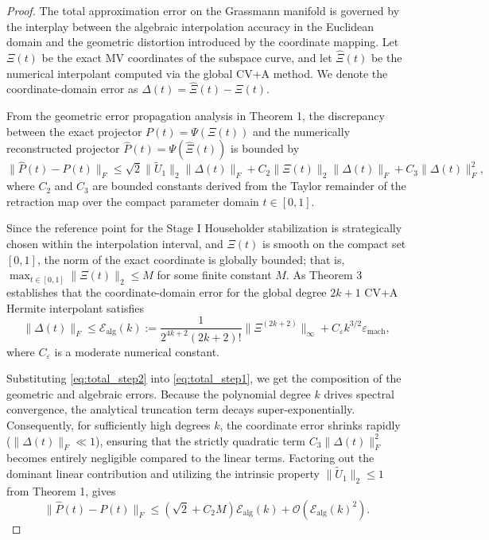 \documentclass[11pt]{article}
\begin{document}
\begin{proof}
The total approximation error on the Grassmann manifold is governed by the interplay between the algebraic interpolation accuracy in the Euclidean domain and the geometric distortion introduced by the coordinate mapping. Let $\Xi(t)$ be the exact MV coordinates of the subspace curve, and let $\hat{\Xi}(t)$ be the numerical interpolant computed via the global CV+A method. We denote the coordinate-domain error as $\Delta(t) = \hat{\Xi}(t) - \Xi(t)$.

From the geometric error propagation analysis in Theorem 1, the discrepancy between the exact projector $P(t) = \Psi(\Xi(t))$ and the numerically reconstructed projector $\hat{P}(t) = \Psi(\hat{\Xi}(t))$ is bounded by
\begin{equation} \label{eq:total_step1}
\|\hat{P}(t) - P(t)\|_F \leq \sqrt{2} \|\widetilde{U}_1\|_2 \|\Delta(t)\|_F + C_2 \|\Xi(t)\|_2 \|\Delta(t)\|_F + C_3 \|\Delta(t)\|_F^2,
\end{equation}
where $C_2$ and $C_3$ are bounded constants derived from the Taylor remainder of the retraction map over the compact parameter domain $t \in [0,1]$.

Since the reference point for the Stage I Householder stabilization is strategically chosen within the interpolation interval, and $\Xi(t)$ is smooth on the compact set $[0,1]$, the norm of the exact coordinate is globally bounded; that is, $\max_{t \in [0,1]} \|\Xi(t)\|_2 \leq M$ for some finite constant $M$.
As Theorem 3 establishes that the coordinate-domain error for the global degree $2k+1$ CV+A Hermite interpolant satisfies
\begin{equation} \label{eq:total_step2}
\|\Delta(t)\|_F \leq \mathcal{E}_{\mathrm{alg}}(k) := \frac{1}{2^{4k+2}(2k+2)!} \|\Xi^{(2k+2)}\|_\infty + C_\varepsilon k^{3/2} \varepsilon_{\mathrm{mach}},
\end{equation}
where $C_\varepsilon$ is a moderate numerical constant.

Substituting \eqref{eq:total_step2} into \eqref{eq:total_step1}, we get the composition of the geometric and algebraic errors. Because the polynomial degree $k$ drives spectral convergence, the analytical truncation term decays super-exponentially. Consequently, for sufficiently high degrees $k$, the coordinate error shrinks rapidly ($\|\Delta(t)\|_F \ll 1$), ensuring that the strictly quadratic term $C_3 \|\Delta(t)\|_F^2$ becomes entirely negligible compared to the linear terms.
Factoring out the dominant linear contribution and utilizing the intrinsic property $\|\widetilde{U}_1\|_2 \le 1$ from Theorem 1, gives
\begin{equation} \label{eq:linear_contribution}
\|\hat{P}(t) - P(t)\|_F \leq \left( \sqrt{2} + C_2 M \right) \mathcal{E}_{\mathrm{alg}}(k) + \mathcal{O}(\mathcal{E}_{\mathrm{alg}}(k)^2).
\end{equation}


\end{proof}
\end{document}
